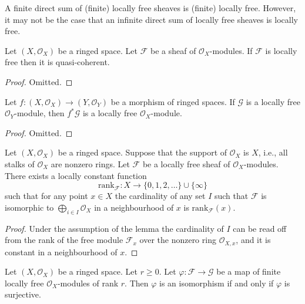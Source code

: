 \noindent
A finite direct sum of (finite) locally free sheaves is (finite)
locally free. However, it may not be the case that an infinite direct
sum of locally free sheaves is locally free.

\begin{lemma}
\label{lemma-locally-free-quasi-coherent}
Let $(X, \mathcal{O}_X)$ be a ringed space.
Let $\mathcal{F}$ be a sheaf of $\mathcal{O}_X$-modules.
If $\mathcal{F}$ is locally free then it is quasi-coherent.
\end{lemma}

\begin{proof}
Omitted.
\end{proof}

\begin{lemma}
\label{lemma-pullback-locally-free}
Let $f : (X, \mathcal{O}_X) \to (Y, \mathcal{O}_Y)$
be a morphism of ringed spaces. If $\mathcal{G}$ is
a locally free $\mathcal{O}_Y$-module, then
$f^*\mathcal{G}$ is a locally free $\mathcal{O}_X$-module.
\end{lemma}

\begin{proof}
Omitted.
\end{proof}

\begin{lemma}
\label{lemma-rank}
Let $(X, \mathcal{O}_X)$ be a ringed space.
Suppose that the support of $\mathcal{O}_X$ is $X$,
i.e., all stalks of $\mathcal{O}_X$ are nonzero rings.
Let $\mathcal{F}$ be a locally free sheaf of $\mathcal{O}_X$-modules.
There exists a locally constant function
$$
\text{rank}_\mathcal{F} :
X \longrightarrow \{0, 1, 2, \ldots\}\cup\{\infty\}
$$
such that for any point $x \in X$ the cardinality of any
set $I$ such that $\mathcal{F}$ is isomorphic to
$\bigoplus_{i\in I} \mathcal{O}_X$ in a neighbourhood
of $x$ is $\text{rank}_\mathcal{F}(x)$.
\end{lemma}

\begin{proof}
Under the assumption of the lemma the cardinality of $I$ can be read off
from the rank of the free module $\mathcal{F}_x$ over the nonzero ring
$\mathcal{O}_{X, x}$, and it is constant in a neighbourhood of $x$.
\end{proof}

\begin{lemma}
\label{lemma-map-finite-locally-free}
Let $(X, \mathcal{O}_X)$ be a ringed space. Let $r \geq 0$.
Let $\varphi : \mathcal{F} \to \mathcal{G}$ be a map of finite
locally free $\mathcal{O}_X$-modules of rank $r$.
Then $\varphi$ is an isomorphism if and only if $\varphi$
is surjective.
\end{lemma}

